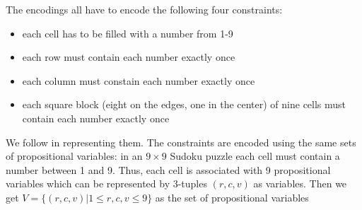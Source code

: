 \documentclass{article}
\begin{document}

The encodings all have to encode the following four constraints:

\begin{itemize}
	\item each cell has to be filled with a number from 1-9
	\item each row must contain each number exactly once
	\item each column must constain each number exactly once
	\item each square block (eight on the edges, one in the center) of nine cells must contain each number exactly once
\end{itemize}

We follow  in representing them. The constraints are encoded using the same sets of propositional variables: in an $9\times 9$ Sudoku puzzle each cell must contain a number between 1 and 9. Thus, each cell is associated with 9 propositional variables which can be represented by 3-tuples $(r, c, v)$ as variables. %
Then we get $V = \{(r, c, v)|1 \leq r, c, v \leq 9\}$ as the set of propositional variables

\end{document}
